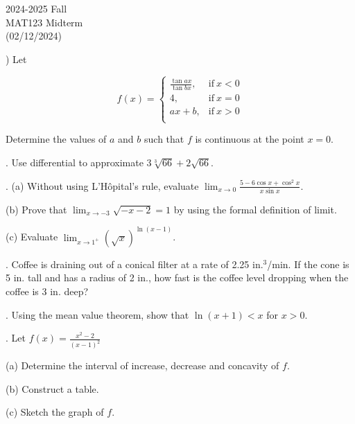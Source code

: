 \documentclass{article}
\begin{document}
\large

\begin{center}
2024-2025 Fall \\MAT123 Midterm\\(02/12/2024)
\end{center}

) Let

\[
f(x) =
\begin{cases}
\displaystyle \frac{\tan ax}{\tan bx}, & \text{if}\ x < 0 \\
4, & \text{if}\ x = 0 \\
ax+b, & \text{if}\ x >0 \\
\end{cases}
\]

\hfill

\noindent Determine the values of $a$ and $b$ such that $f$ is continuous at the point $x=0$.

\hfill

. Use differential to approximate $3\sqrt[3]{66}+2\sqrt{66}$.

\hfill

. (a) Without using L'Hôpital's rule, evaluate $\displaystyle \lim_{x\to 0} \frac{5-6\cos x + \cos^2x}{x\sin x}$.

\hfill

\noindent (b) Prove that $\displaystyle \lim_{x\to -3} \sqrt{-x-2} = 1$ by using the formal definition of limit.

\hfill

\noindent (c) Evaluate $\displaystyle\lim_{x\to1^+} (\sqrt x)^{\ln(x-1)}$.

\hfill

. Coffee is draining out of a conical filter at a rate of 2.25 in.$^3$/min. If the cone is 5 in. tall and has a radius of 2 in., how fast is the coffee level dropping when the coffee is 3 in. deep?

\hfill

. Using the mean value theorem, show that $\ln(x+1) < x$ for $x > 0$.

\hfill

. Let $\displaystyle f(x) = \frac{x^2-2}{(x-1)^2}$

\hfill

(a) Determine the interval of increase, decrease and concavity of $f$.

(b) Construct a table.

(c) Sketch the graph of $f$.
\end{document}
